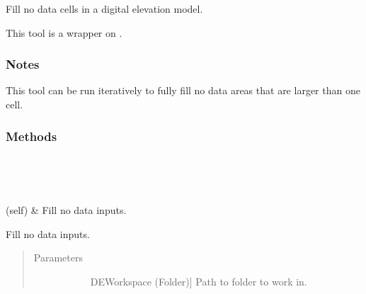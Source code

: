 \documentclass[letterpaper,10pt,english]{sphinxmanual}
\begin{document}
\begin{fulllineitems}
\label{\detokenize{StreamStats_DataPrep:StreamStats_DataPrep.FillNoData}}
Fill no data cells in a digital elevation model.

This tool is a wrapper on {\hyperref[\detokenize{elevationTools:elevationTools.fillNoData}]{}}.
\subsubsection*{Notes}

This tool can be run iteratively to fully fill no data areas that are larger than one cell.
\subsubsection*{Methods}


\begin{savenotes}\sphinxatlongtablestart\begin{longtable}{}
\hline

\endfirsthead

%
{}\\
\hline

\endhead

\hline
{}\\
\endfoot

\endlastfoot

{\hyperref[\detokenize{StreamStats_DataPrep:StreamStats_DataPrep.FillNoData.getParameterInfo}]{}}(self)
&
Fill no data inputs.
\\
\hline
\end{longtable}\sphinxatlongtableend\end{savenotes}

\begin{fulllineitems}
\label{\detokenize{StreamStats_DataPrep:StreamStats_DataPrep.FillNoData.getParameterInfo}}
Fill no data inputs.
\begin{quote}\begin{description}
\item[{Parameters}] \leavevmode\begin{description}
\item[{}] \leavevmode{[}DEWorkspace (Folder){]}
Path to folder to work in.


\end{description}
\end{description}
\end{quote}
\end{fulllineitems}
\end{fulllineitems}
\end{document}
